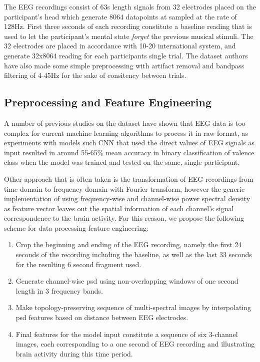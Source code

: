 \documentclass[14pt]{extreport}
\begin{document}
The EEG recordings consist of 63s length signals from 32 electrodes placed on the participant's head which generate 8064 datapoints at sampled at the rate of 128Hz. First three seconds of each recording constitute a baseline reading that is used to let the participant's mental state \emph{forget} the previous musical stimuli. The 32 electrodes are placed in accordance with 10-20 international system, and generate 32x8064 reading for each participants single trial. The dataset authors have also made some simple preprocessing with artifact removal and bandpass filtering of 4-45Hz for the sake of consitency between trials. 

\subsection{Preprocessing and Feature Engineering}
A number of previous studies on the dataset have shown that EEG data is too complex for current machine learning algorithms to process it in raw format, as experiments with models such CNN that used the direct values of EEG signals as input resulted in around 55-65\% mean accuracy in binary classification of \gls{valence} class when the model was trained and tested on the same, single participant. 

Other approach that is often taken is the transformation of EEG recordings from time-domain to frequency-domain with Fourier transform, however the generic implementation of using frequency-wise and channel-wise power spectral density as feature vector leaves out the spatial information of each channel's signal correspondence to the brain activity. For this reason, we propose the following scheme for data processing feature engineering: 

\begin{enumerate}[1)]
    \item Crop the beginning and ending of the EEG recording, namely the first 24 seconds of the recording including the baseline, as well as the last 33 seconds for the resulting 6 second fragment used.
    \item Generate channel-wise \acrshort{psd} using non-overlapping windows of one second length in 3 frequency bands.
    \item Make topology-preserving sequence of multi-spectral images by interpolating \acrshort{psd} features based on distance between EEG electrodes.
    \item Final features for the model input constitute a sequence of six 3-channel images, each corresponding to a one second of EEG recording and illustrating brain activity during this time period.
\end{enumerate}
\end{document}
